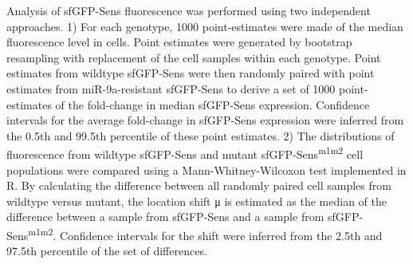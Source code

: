 Analysis of sfGFP-Sens fluorescence was performed using two independent approaches. 1) For each genotype, 1000 point-estimates were made of the median fluorescence level in cells. Point estimates were generated by bootstrap resampling with replacement of the cell samples within each genotype. Point estimates from wildtype sfGFP-Sens were then randomly paired with point estimates from miR-9a-resistant sfGFP-Sens to derive a set of 1000 point-estimates of the fold-change in median sfGFP-Sens expression. Confidence intervals for the average fold-change in sfGFP-Sens expression were inferred from the 0.5th and 99.5th percentile of these point estimates. 2) The distributions of fluorescence from wildtype sfGFP-Sens and mutant sfGFP-Sens\textsuperscript{m1m2} cell populations were compared using a Mann-Whitney-Wilcoxon test implemented in R. By calculating the difference between all randomly paired cell samples from wildtype versus mutant, the location shift μ is estimated as the median of the difference between a sample from sfGFP-Sens and a sample from sfGFP-Sens\textsuperscript{m1m2}. Confidence intervals for the shift were inferred from the 2.5th and 97.5th percentile of the set of differences.